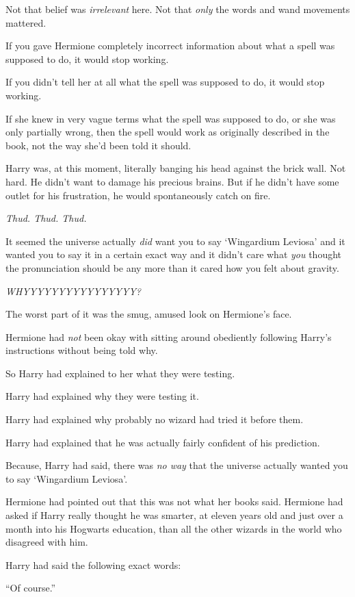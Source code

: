 Not that belief was \emph{irrelevant} here. Not that \emph{only} the
words and wand movements mattered.

If you gave Hermione completely incorrect information about what a spell
was supposed to do, it would stop working.

If you didn't tell her at all what the spell was supposed to do, it
would stop working.

If she knew in very vague terms what the spell was supposed to do, or
she was only partially wrong, then the spell would work as originally
described in the book, not the way she'd been told it should.

Harry was, at this moment, literally banging his head against the brick
wall. Not hard. He didn't want to damage his precious brains. But if he
didn't have some outlet for his frustration, he would spontaneously
catch on fire.

\emph{Thud. Thud. Thud.}

It seemed the universe actually \emph{did} want you to say `Wingardium
Leviosa' and it wanted you to say it in a certain exact way and it
didn't care what \emph{you} thought the pronunciation should be any more
than it cared how you felt about gravity.

\emph{WHYYYYYYYYYYYYYYYY?}

The worst part of it was the smug, amused look on Hermione's face.

Hermione had \emph{not} been okay with sitting around obediently
following Harry's instructions without being told why.

So Harry had explained to her what they were testing.

Harry had explained why they were testing it.

Harry had explained why probably no wizard had tried it before them.

Harry had explained that he was actually fairly confident of his
prediction.

Because, Harry had said, there was \emph{no way} that the universe
actually wanted you to say `Wingardium Leviosa'.

Hermione had pointed out that this was not what her books said. Hermione
had asked if Harry really thought he was smarter, at eleven years old
and just over a month into his Hogwarts education, than all the other
wizards in the world who disagreed with him.

Harry had said the following exact words:

``Of course.''

